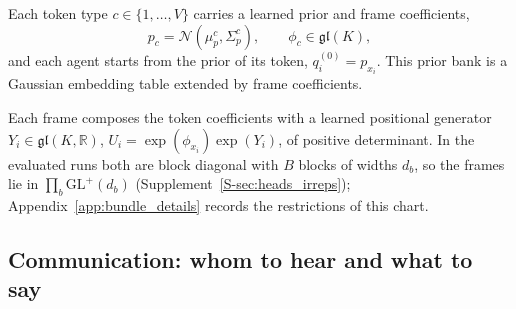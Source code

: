 \documentclass[twoside,11pt]{article}
\begin{document}
\label{sec:embeddings}
Each token type \(c\in\{1,\ldots,V\}\) carries a learned prior and frame coefficients,
\begin{equation}
p_c=\mathcal N(\mu_p^c,\Sigma_p^c),\qquad \phi_c\in\mathfrak{gl}(K),
\label{eq:prior_bank}
\end{equation}
and each agent starts from the prior of its token, \(q_i^{(0)}=p_{x_i}\). This prior bank is a Gaussian embedding table \citep{Vilnis2015Gaussian} extended by frame coefficients.

Each frame composes the token coefficients with a learned positional generator \(Y_i\in\mathfrak{gl}(K,\mathbb R)\), \(U_i=\exp(\phi_{x_i})\exp(Y_i)\), of positive determinant. In the evaluated runs both are block diagonal with \(B\) blocks of widths \(d_b\), so the frames lie in \(\prod_b\mathrm{GL}^+(d_b)\) (Supplement~\ref{S-sec:heads_irreps}); Appendix~\ref{app:bundle_details} records the restrictions of this chart.

\subsection{Communication: whom to hear and what to say}
\label{sec:role_measurements}
\end{document}
